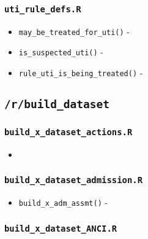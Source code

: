 \documentclass[
]{book}
\providecommand{\tightlist}{%
  \setlength{\itemsep}{0pt}\setlength{\parskip}{0pt}}
\begin{document}
\hypertarget{uti_rule_defs.r}{%
\subsubsection{\texorpdfstring{\texttt{uti\_rule\_defs.R}}{uti\_rule\_defs.R}}\label{uti_rule_defs.r}}

\begin{itemize}
\tightlist
\item
  \texttt{may\_be\_treated\_for\_uti()} -
\item
  \texttt{is\_suspected\_uti()} -
\item
  \texttt{rule\_uti\_is\_being\_treated()} -
\end{itemize}

\hypertarget{rbuild_dataset}{%
\subsection{\texorpdfstring{\texttt{/r/build\_dataset}}{/r/build\_dataset}}\label{rbuild_dataset}}

\hypertarget{build_x_dataset_actions.r}{%
\subsubsection{\texorpdfstring{\texttt{build\_x\_dataset\_actions.R}}{build\_x\_dataset\_actions.R}}\label{build_x_dataset_actions.r}}

\begin{itemize}
\item
\end{itemize}

\hypertarget{build_x_dataset_admission.r}{%
\subsubsection{\texorpdfstring{\texttt{build\_x\_dataset\_admission.R}}{build\_x\_dataset\_admission.R}}\label{build_x_dataset_admission.r}}

\begin{itemize}
\tightlist
\item
  \texttt{build\_x\_adm\_assmt()} -
\end{itemize}

\hypertarget{build_x_dataset_anci.r}{%
\subsubsection{\texorpdfstring{\texttt{build\_x\_dataset\_ANCI.R}}{build\_x\_dataset\_ANCI.R}}\label{build_x_dataset_anci.r}}
\end{document}
